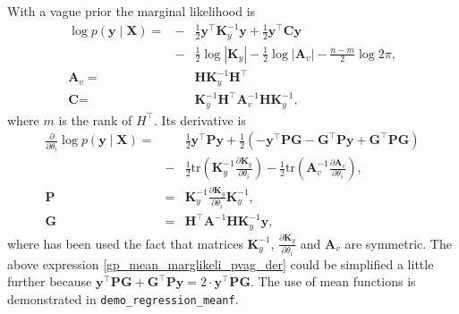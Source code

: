 \documentclass[twoside,11pt]{article}
\newcommand{\code}[1]{{\normalfont\texttt{#1}}}
\begin{document}
% 
With a vague prior the marginal likelihood is 
% 
\begin{eqnarray}
  \log p(\textbf{y} \mid \textbf{X}) = &-&\frac{1}{2}\textbf{y}^\top \textbf{K}_y^{-1}\textbf{y} 
  + \frac{1}{2}\textbf{y}^\top \textbf{C}\textbf{y}			\nonumber\\
  &-&\frac{1}{2}\log |\textbf{K}_y|-\frac{1}{2}\log |\textbf{A}_v|
  -\frac{n-m}{2}\log 2\pi, 						\nonumber\\
  \textbf{A}_v = && \textbf{H}\textbf{K}_y^{-1}\textbf{H}^\top			\nonumber\\
  \textbf{C} =&& \textbf{K}_y^{-1}\textbf{H}^\top\textbf{A}_v^{-1}\textbf{H}\textbf{K}_y^{-1}, \nonumber
\end{eqnarray}
% 
where $m$ is the rank of $H^\top$. Its derivative is
\begin{eqnarray}
  \label{gp_mean_marglikeli_pvag_der}
  \frac{\partial }{\partial \theta_i} \log p(\textbf{y} \mid \textbf{X})
  = &&\frac{1}{2}\textbf{y}^\top \textbf{P}\textbf{y}
  +\frac{1}{2}\left(-\textbf{y}^\top\textbf{P}\textbf{G}
    -\textbf{G}^\top\textbf{P}\textbf{y}
    +\textbf{G}^\top\textbf{P}\textbf{G}\right)\\
  &-&\frac{1}{2}\text{tr}\left(\textbf{K}_y^{-1} \frac{\partial
      \textbf{K}_y}{\partial \theta_i} \right) -
  \frac{1}{2}\text{tr}\left(\textbf{A}_v^{-1} \frac{\partial
      \textbf{A}_v}{\partial \theta_i} \right),        \nonumber\\
  \textbf{P} &=&    \textbf{K}_y^{-1} \frac{\partial \textbf{K}_y}{\partial
    \theta_i}\textbf{K}_y^{-1},\nonumber\\
  \textbf{G}
  &=&    \textbf{H}^\top\textbf{A}^{-1}\textbf{H}\textbf{K}_y^{-1}\textbf{y},    \nonumber
\end{eqnarray} 
% 
where has been used the fact that matrices $\textbf{K}_y^{-1}$,
$\frac{\partial \textbf{K}_y}{\partial \theta_i}$ and $\textbf{A}_v$
are symmetric. The above expression
\eqref{gp_mean_marglikeli_pvag_der} could be simplified a little
further because $\textbf{y}^\top\textbf{P}\textbf{G}
+\textbf{G}^\top\textbf{P}\textbf{y} = 2\cdot
\textbf{y}^\top\textbf{P}\textbf{G}$. The use of mean functions is
demonstrated in \code{demo\_regression\_meanf}.


\end{document}
